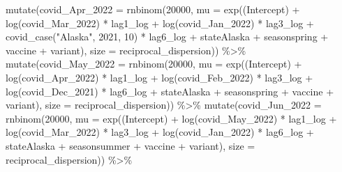 \documentclass[
]{book}
\newenvironment{Shaded}{\begin{snugshade}}{\end{snugshade}}
\newcommand{\AttributeTok}[1]{\textcolor[rgb]{0.77,0.63,0.00}{#1}}
\newcommand{\DecValTok}[1]{\textcolor[rgb]{0.00,0.00,0.81}{#1}}
\newcommand{\FunctionTok}[1]{\textcolor[rgb]{0.00,0.00,0.00}{#1}}
\newcommand{\NormalTok}[1]{#1}
\newcommand{\SpecialCharTok}[1]{\textcolor[rgb]{0.00,0.00,0.00}{#1}}
\newcommand{\StringTok}[1]{\textcolor[rgb]{0.31,0.60,0.02}{#1}}
\begin{document}
\begin{Shaded}
\begin{Highlighting}[]
  \FunctionTok{mutate}\NormalTok{(}\AttributeTok{covid\_Apr\_2022 =} \FunctionTok{rnbinom}\NormalTok{(}\DecValTok{20000}\NormalTok{, }\AttributeTok{mu =} \FunctionTok{exp}\NormalTok{(}\StringTok{\textasciigrave{}}\AttributeTok{(Intercept)}\StringTok{\textasciigrave{}} \SpecialCharTok{+} \FunctionTok{log}\NormalTok{(covid\_Mar\_2022) }\SpecialCharTok{*}\NormalTok{ lag1\_log }\SpecialCharTok{+} \FunctionTok{log}\NormalTok{(covid\_Jan\_2022) }\SpecialCharTok{*}\NormalTok{ lag3\_log }\SpecialCharTok{+} \FunctionTok{covid\_case}\NormalTok{(}\StringTok{"Alaska"}\NormalTok{, }\DecValTok{2021}\NormalTok{, }\DecValTok{10}\NormalTok{) }\SpecialCharTok{*}\NormalTok{ lag6\_log }\SpecialCharTok{+}\NormalTok{ stateAlaska }\SpecialCharTok{+}\NormalTok{ seasonspring }\SpecialCharTok{+}\NormalTok{ vaccine }\SpecialCharTok{+}\NormalTok{ variant), }\AttributeTok{size =}\NormalTok{ reciprocal\_dispersion)) }\SpecialCharTok{\%\textgreater{}\%}
  \FunctionTok{mutate}\NormalTok{(}\AttributeTok{covid\_May\_2022 =} \FunctionTok{rnbinom}\NormalTok{(}\DecValTok{20000}\NormalTok{, }\AttributeTok{mu =} \FunctionTok{exp}\NormalTok{(}\StringTok{\textasciigrave{}}\AttributeTok{(Intercept)}\StringTok{\textasciigrave{}} \SpecialCharTok{+} \FunctionTok{log}\NormalTok{(covid\_Apr\_2022) }\SpecialCharTok{*}\NormalTok{ lag1\_log }\SpecialCharTok{+} \FunctionTok{log}\NormalTok{(covid\_Feb\_2022) }\SpecialCharTok{*}\NormalTok{ lag3\_log }\SpecialCharTok{+} \FunctionTok{log}\NormalTok{(covid\_Dec\_2021) }\SpecialCharTok{*}\NormalTok{ lag6\_log }\SpecialCharTok{+}\NormalTok{ stateAlaska }\SpecialCharTok{+}\NormalTok{ seasonspring }\SpecialCharTok{+}\NormalTok{ vaccine }\SpecialCharTok{+}\NormalTok{ variant), }\AttributeTok{size =}\NormalTok{ reciprocal\_dispersion)) }\SpecialCharTok{\%\textgreater{}\%}
  \FunctionTok{mutate}\NormalTok{(}\AttributeTok{covid\_Jun\_2022 =} \FunctionTok{rnbinom}\NormalTok{(}\DecValTok{20000}\NormalTok{, }\AttributeTok{mu =} \FunctionTok{exp}\NormalTok{(}\StringTok{\textasciigrave{}}\AttributeTok{(Intercept)}\StringTok{\textasciigrave{}} \SpecialCharTok{+} \FunctionTok{log}\NormalTok{(covid\_May\_2022) }\SpecialCharTok{*}\NormalTok{ lag1\_log }\SpecialCharTok{+} \FunctionTok{log}\NormalTok{(covid\_Mar\_2022) }\SpecialCharTok{*}\NormalTok{ lag3\_log }\SpecialCharTok{+} \FunctionTok{log}\NormalTok{(covid\_Jan\_2022) }\SpecialCharTok{*}\NormalTok{ lag6\_log }\SpecialCharTok{+}\NormalTok{ stateAlaska }\SpecialCharTok{+}\NormalTok{ seasonsummer }\SpecialCharTok{+}\NormalTok{ vaccine }\SpecialCharTok{+}\NormalTok{ variant), }\AttributeTok{size =}\NormalTok{ reciprocal\_dispersion)) }\SpecialCharTok{\%\textgreater{}\%}

\end{Highlighting}
\end{Shaded}
\end{document}

